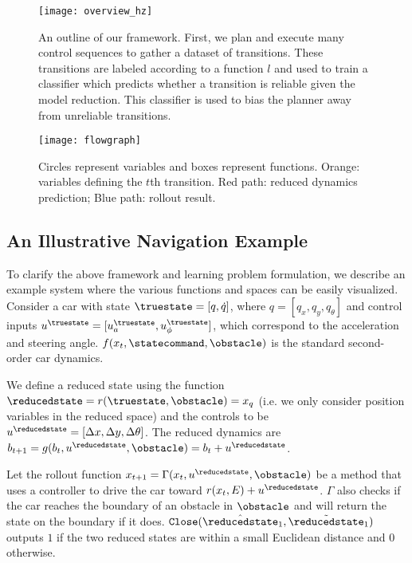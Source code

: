 \begin{figure}[t]
    \vspace{0.02in}
    \centering
    \texttt{[image: overview\_hz]}
    \vspace{-0.15in}
    \caption{An outline of our framework. First, we plan and execute many control sequences to gather a dataset of transitions. These transitions are labeled according to a function $l$ and used to train a classifier which predicts whether a transition is reliable given the model reduction. This classifier is used to bias the planner away from unreliable transitions.}
    \label{fig:overview}
    \vspace{0.1in}
    \centering
    \texttt{[image: flowgraph]}
    \vspace{-0.1in}
    \caption{Circles represent variables and boxes represent functions. Orange: variables defining the $t$th transition. Red path: reduced dynamics prediction; Blue path: rollout result.}
    \vspace{-0.1in}
    \label{fig:flowgraph}
\end{figure}


\subsection{An Illustrative Navigation Example}

\label{sec:car_example}
To clarify the above framework and learning problem formulation, we describe an example system where the various functions and spaces can be easily visualized. Consider a car with state $\truestate = [q,\dot{q}]$, where $q = [q_x,q_y,q_\theta]$ and control inputs $u^{\truestate} = [u^{\truestate}_a,u^{\truestate}_\phi]$, which correspond to the acceleration and steering angle. $f(x_t,\statecommand,\obstacle)$ is the standard second-order car dynamics. 

We define a reduced state using the function $\reducedstate = r(\truestate,\obstacle) = x_q$ (i.e. we only consider position variables in the reduced space) and the controls to be $u^\reducedstate = [\Delta x,\Delta y, \Delta \theta ]$. The reduced dynamics are $b_{t+1} = g(b_t,u^\reducedstate,\obstacle) = b_t + u^\reducedstate$.

Let the rollout function $x_{t+1} = \Gamma(x_t,u^\reducedstate,\obstacle)$ be a method that uses a controller to drive the car toward $r(x_t,E) + u^\reducedstate$. $\Gamma$ also checks if the car reaches the boundary of an obstacle in $\obstacle$ and will return the state on the boundary if it does. $\texttt{Close}(\hat{\reducedstate}_1,\tilde{\reducedstate}_1)$ outputs $1$ if the two reduced states are within a small Euclidean distance and $0$ otherwise. 

